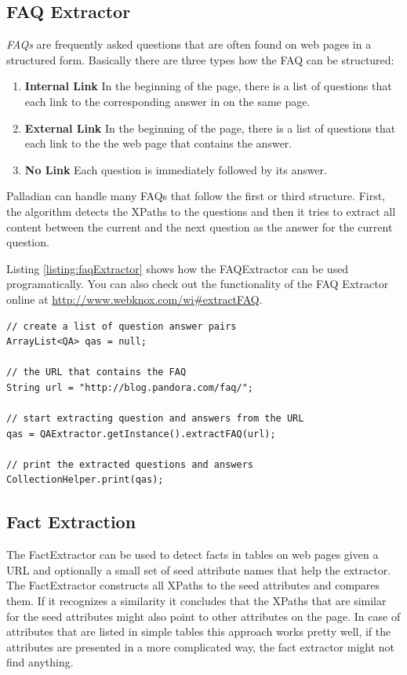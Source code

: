 \documentclass[a4paper,twoside]{book}      %
\begin{document}
\subsection{FAQ Extractor}
\textit{ FAQs} are frequently asked questions that are often found on web pages in a structured form. Basically there are three types how the FAQ can be structured:
\begin{enumerate}
\item \textbf{ Internal Link} In the beginning of the page, there is a list of questions that each link to the corresponding answer in on the same page.
\item \textbf{ External Link} In the beginning of the page, there is a list of questions that each link to the the web page that contains the answer.
\item \textbf{ No Link} Each question is immediately followed by its answer.
\end{enumerate}

Palladian can handle many FAQs that follow the first or third structure. First, the algorithm detects the XPaths to the questions and then it tries to extract all content between the current and the next question as the answer for the current question.

Listing \ref{listing:faqExtractor} shows how the FAQExtractor can be used programatically. You can also check out the functionality of the FAQ Extractor online at \url{http://www.webknox.com/wi#extractFAQ}.

\begin{codelisting}
\begin{lstlisting}[label=listing:faqExtractor,caption=Extract an FAQ from a web page.,frame=tb]
// create a list of question answer pairs
ArrayList<QA> qas = null;

// the URL that contains the FAQ
String url = "http://blog.pandora.com/faq/";

// start extracting question and answers from the URL
qas = QAExtractor.getInstance().extractFAQ(url);

// print the extracted questions and answers
CollectionHelper.print(qas);
\end{lstlisting}
\end{codelisting}

\subsection{Fact Extraction}
The FactExtractor can be used to detect facts in tables on web pages given a URL and optionally a small set of seed attribute names that help the extractor. The FactExtractor constructs all XPaths to the seed attributes and compares them. If it recognizes a similarity it concludes that the XPaths that are similar for the seed attributes might also point to other attributes on the page. In case of attributes that are listed in simple tables this approach works pretty well, if the attributes are presented in a more complicated way, the fact extractor might not find anything.
\end{document}
